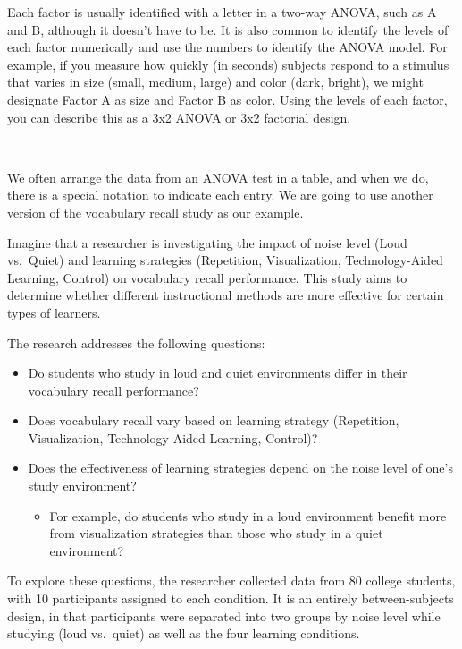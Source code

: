 \documentclass[
  letterpaper,
  DIV=11,
  numbers=noendperiod]{scrreprt}
\providecommand{\tightlist}{%
  \setlength{\itemsep}{0pt}\setlength{\parskip}{0pt}}
\begin{document}
Each factor is usually identified with a letter in a two-way ANOVA, such
as A and B, although it doesn't have to be. It is also common to
identify the levels of each factor numerically and use the numbers to
identify the ANOVA model. For example, if you measure how quickly (in
seconds) subjects respond to a stimulus that varies in size (small,
medium, large) and color (dark, bright), we might designate Factor A as
size and Factor B as color. Using the levels of each factor, you can
describe this as a 3x2 ANOVA or 3x2 factorial design.\,

\,

We often arrange the data from an ANOVA test in a table, and when we do,
there is a special notation to indicate each entry. We are going to use
another version of the vocabulary recall study as our example.

Imagine that a researcher is investigating the impact of noise level
(Loud vs.~Quiet) and learning strategies (Repetition, Visualization,
Technology-Aided Learning, Control) on vocabulary recall performance.
This study aims to determine whether different instructional methods are
more effective for certain types of learners.

The research addresses the following questions:

\begin{itemize}
\item
  Do students who study in loud and quiet environments differ in their
  vocabulary recall performance?
\item
  Does vocabulary recall vary based on learning strategy (Repetition,
  Visualization, Technology-Aided Learning, Control)?
\item
  Does the effectiveness of learning strategies depend on the noise
  level of one's study environment?

  \begin{itemize}
  \tightlist
  \item
    For example, do students who study in a loud environment benefit
    more from visualization strategies than those who study in a quiet
    environment?
  \end{itemize}
\end{itemize}

To explore these questions, the researcher collected data from 80
college students, with 10 participants assigned to each condition. It is
an entirely between-subjects design, in that participants were separated
into two groups by noise level while studying (loud vs.~quiet) as well
as the four learning conditions.\,\,
\end{document}
